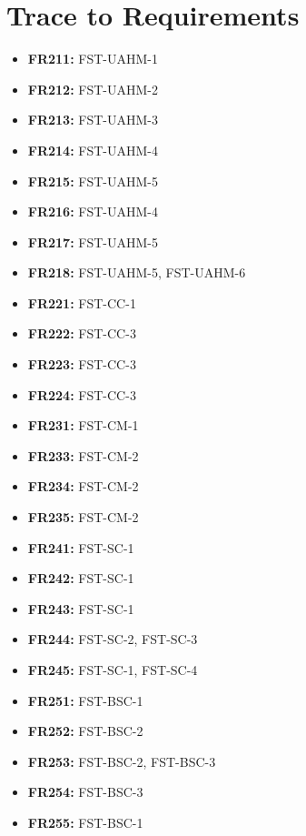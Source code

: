 \documentclass[12pt, titlepage]{article}
\begin{document}
\section{Trace to Requirements}
    \begin{itemize}
      \item \textbf{FR211:} FST-UAHM-1
      \item \textbf{FR212:} FST-UAHM-2
      \item \textbf{FR213:} FST-UAHM-3
      \item \textbf{FR214:} FST-UAHM-4
      \item \textbf{FR215:} FST-UAHM-5
      \item \textbf{FR216:} FST-UAHM-4
      \item \textbf{FR217:} FST-UAHM-5
      \item \textbf{FR218:} FST-UAHM-5, FST-UAHM-6
      \item \textbf{FR221:} FST-CC-1
      \item \textbf{FR222:} FST-CC-3
      \item \textbf{FR223:} FST-CC-3
      \item \textbf{FR224:} FST-CC-3
      \item \textbf{FR231:} FST-CM-1
      \item \textbf{FR233:} FST-CM-2
      \item \textbf{FR234:} FST-CM-2
      \item \textbf{FR235:} FST-CM-2
      \item \textbf{FR241:} FST-SC-1
      \item \textbf{FR242:} FST-SC-1
      \item \textbf{FR243:} FST-SC-1
      \item \textbf{FR244:} FST-SC-2, FST-SC-3
      \item \textbf{FR245:} FST-SC-1, FST-SC-4
      \item \textbf{FR251:} FST-BSC-1
      \item \textbf{FR252:} FST-BSC-2
      \item \textbf{FR253:} FST-BSC-2, FST-BSC-3
      \item \textbf{FR254:} FST-BSC-3
      \item \textbf{FR255:} FST-BSC-1
    \end{itemize}
\end{document}
